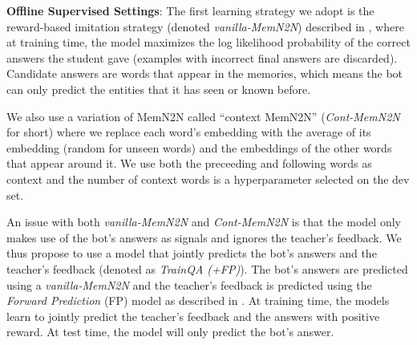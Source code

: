 {\bf Offline Supervised Settings}:
The first learning strategy we adopt is
the reward-based imitation strategy (denoted {\it vanilla-MemN2N}) described in , where
at training time, the model maximizes the log likelihood probability
of the correct answers the student gave (examples with incorrect final answers are discarded).
Candidate answers are words that appear in the memories,
which means the bot can only predict the entities that it has seen or known before.

We also use a variation of MemN2N called ``context MemN2N'' ({\it Cont-MemN2N} for short)
where we replace each word's embedding with the average of its embedding (random for
unseen words) and the embeddings of the other words that appear around it.
We use both the preceeding and following words as context and the number of context words is
a hyperparameter selected on the dev set.

An issue with both {\it vanilla-MemN2N} and {\it Cont-MemN2N}  is that the model only makes use of
the bot's answers as signals and ignores the teacher's feedback.
We thus propose to use a  model that jointly predicts the bot's answers and the teacher's feedback
(denoted as {\it TrainQA (+FP)}).
The bot's answers are predicted using a {\it vanilla-MemN2N}  and the teacher's feedback is
predicted using the {\it Forward Prediction} (FP) model as described in .
At training time, the models learn to jointly predict the teacher's feedback
and the answers with positive reward. At test time, the model will only predict the bot's answer.

